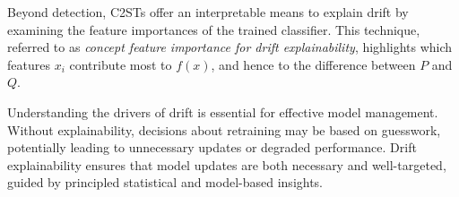 Beyond detection, C2STs offer an interpretable means to explain drift by
examining the feature importances of the trained classifier. This technique,
referred to as \emph{concept feature importance for drift explainability},
highlights which features $x_i$ contribute most to $f(x)$, and hence to the
difference between $P$ and $Q$.

Understanding the drivers of drift is essential for effective model management.
Without explainability, decisions about retraining may be based on guesswork,
potentially leading to unnecessary updates or degraded performance. Drift
explainability ensures that model updates are both necessary and well-targeted,
guided by principled statistical and model-based insights.
